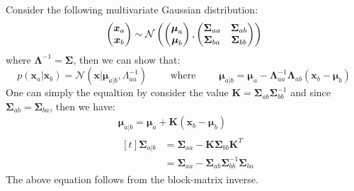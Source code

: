 \begin{proposition}
    Consider the following multivariate Gaussian distribution:
    \begin{equation*}
        \begin{pmatrix}
            \boldsymbol x_a \\ \boldsymbol x_b
        \end{pmatrix} \sim \mathcal{N}\left( \begin{pmatrix}
            \boldsymbol \mu_a  \\ \boldsymbol \mu_b
        \end{pmatrix}, \begin{pmatrix}
            \boldsymbol \Sigma_{aa} & \boldsymbol \Sigma_{ab} \\
            \boldsymbol \Sigma_{ba} & \boldsymbol \Sigma_{bb} \\
        \end{pmatrix} \right)
    \end{equation*}
    where $\boldsymbol \Lambda^{-1} = \boldsymbol \Sigma$, then we can show that:
    \begin{equation*}
        p(\boldsymbol x_a | \boldsymbol x_b) = \mathcal{N}(\boldsymbol x|\boldsymbol \mu_{a|b}, \Lambda_{aa}^{-1}) \qquad \text{ where } \qquad \boldsymbol \mu_{a|b} = \boldsymbol \mu_a - \boldsymbol \Lambda_{aa}^{-1}\boldsymbol \Lambda_{ab}(\boldsymbol x_b - \boldsymbol \mu_b)
    \end{equation*}
    One can simply the equaltion by consider the value $\boldsymbol K= \boldsymbol \Sigma_{ab}\boldsymbol \Sigma_{bb}^{-1}$ and since $\boldsymbol \Sigma_{ab} = \boldsymbol \Sigma_{ba}$, then we have:
    \begin{equation*}
    \begin{aligned}
        &\boldsymbol \mu_{a|b} = \boldsymbol \mu_a + \boldsymbol K(\boldsymbol x_b - \boldsymbol \mu_b) \\ 
        &\begin{aligned}[t]    
            \boldsymbol \Sigma_{a|b} &= \boldsymbol \Sigma_{aa} - \boldsymbol K\boldsymbol \Sigma_{bb}\boldsymbol K^T \\
            &= \boldsymbol \Sigma_{aa} - \boldsymbol \Sigma_{ab}\boldsymbol \Sigma_{bb}^{-1}\boldsymbol \Sigma_{ba}
        \end{aligned}
    \end{aligned}
    \end{equation*}
    The above equation follows from the block-matrix inverse. 
\end{proposition}
